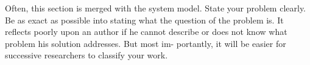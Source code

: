 Often, this section is merged with the system model.
State your problem clearly. Be as exact as possible into
stating what the question of the problem is. It reflects
poorly upon an author if he cannot describe or does not
know what problem his solution addresses. But most im-
portantly, it will be easier for successive researchers to
classify your work.
